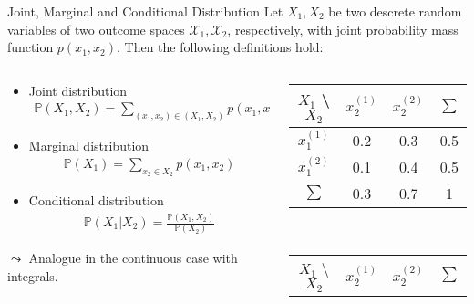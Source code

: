 \documentclass[11pt,compress,t,notes=noshow, aspectratio=169, xcolor=table]{beamer}
\begin{document}
\begin{frame}{Joint, Marginal and Conditional Distribution}
    Let $X_1, X_2$ be two descrete random variables of two outcome spaces $\mathcal{X}_1, \mathcal{X}_2$, respectively, with joint probability mass function $p(x_1,x_2)$. Then the following definitions hold:\\
    \begin{columns}[c, totalwidth=\textwidth]
    \begin{column}{0.5\linewidth}
    \begin{itemize}
        \setlength{\itemsep}{0pt}
        \item Joint distribution
        \begin{align*}
            \mathbb{P}(X_1, X_2) = \sum_{(x_1,x_2)\in (X_1,X_2)} p(x_1,x_2)
        \end{align*}
        \item Marginal distribution
        \begin{align*}
            \mathbb{P}(X_1) = \sum_{x_2\in X_2} p(x_1,x_2)
        \end{align*}
        \item Conditional distribution
        \begin{align*}
            \mathbb{P}(X_1 | X_2) = \frac{\mathbb{P}(X_1, X_2)}{\mathbb{P}(X_2)}
        \end{align*}
    \end{itemize}
    $\leadsto$ Analogue in the continuous case with integrals.
    \end{column}
    \begin{column}{0.5\linewidth}
    \centering
    \begin{table}
    \scriptsize
        \begin{tabular}{|c|c|c|c|}
            \hline 
            $X_1$ \textbackslash $X_2$ & $x_2^{(1)}$ & $x_2^{(2)}$ & $\sum$ \\
            \hline
            $x_1^{(1)}$ & \cellcolor{gray}0.2 & \cellcolor{gray}0.3 & 0.5  \\
            \hline
            $x_1^{(2)}$ & \cellcolor{gray}0.1 & \cellcolor{gray}0.4 & 0.5  \\
            \hline
            $\sum$ & 0.3 & 0.7 & 1  \\
            \hline
        \end{tabular} \\
        \bigskip
        \begin{tabular}{|c|c|c|c|}
            \hline 
            $X_1$ \textbackslash $X_2$ & $x_2^{(1)}$ & $x_2^{(2)}$ & $\sum$ \\

\end{tabular}
\end{table}
\end{column}
\end{columns}
\end{frame}
\end{document}
